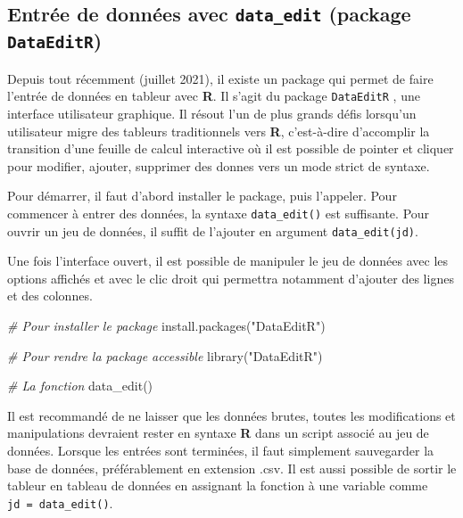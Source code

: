 \documentclass[
]{book}
\newenvironment{Shaded}{}{}
\newcommand{\CommentTok}[1]{\textit{#1}}
\newcommand{\FunctionTok}[1]{#1}
\newcommand{\NormalTok}[1]{#1}
\newcommand{\StringTok}[1]{#1}
\begin{document}
\hypertarget{entruxe9e-de-donnuxe9es-avec-data_edit-package-dataeditr}{%
\subsection{\texorpdfstring{Entrée de données avec \texttt{data\_edit} (package \texttt{DataEditR})}{Entrée de données avec data\_edit (package DataEditR)}}\label{entruxe9e-de-donnuxe9es-avec-data_edit-package-dataeditr}}

Depuis tout récemment (juillet 2021), il existe un package qui permet de faire l'entrée de données en tableur avec \textbf{R}. Il s'agit du package \texttt{DataEditR} \autocite{DataEditR}, une interface utilisateur graphique. Il résout l'un de plus grands défis lorsqu'un utilisateur migre des tableurs traditionnels vers \textbf{R}, c'est-à-dire d'accomplir la transition d'une feuille de calcul interactive où il est possible de pointer et cliquer pour modifier, ajouter, supprimer des donnes vers un mode strict de syntaxe.

Pour démarrer, il faut d'abord installer le package, puis l'appeler. Pour commencer à entrer des données, la syntaxe \texttt{data\_edit()} est suffisante. Pour ouvrir un jeu de données, il suffit de l'ajouter en argument \texttt{data\_edit(jd)}.

Une fois l'interface ouvert, il est possible de manipuler le jeu de données avec les options affichés et avec le clic droit qui permettra notamment d'ajouter des lignes et des colonnes.

\begin{Shaded}
\begin{Highlighting}[]
\CommentTok{\# Pour installer le package}
\FunctionTok{install.packages}\NormalTok{(}\StringTok{"DataEditR"}\NormalTok{)}

\CommentTok{\# Pour rendre la package accessible}
\FunctionTok{library}\NormalTok{(}\StringTok{"DataEditR"}\NormalTok{)}

\CommentTok{\# La fonction}
\FunctionTok{data\_edit}\NormalTok{()}
\end{Highlighting}
\end{Shaded}

Il est recommandé de ne laisser que les données brutes, toutes les modifications et manipulations devraient rester en syntaxe \textbf{R} dans un script associé au jeu de données. Lorsque les entrées sont terminées, il faut simplement sauvegarder la base de données, préférablement en extension .csv. Il est aussi possible de sortir le tableur en tableau de données en assignant la fonction à une variable comme \texttt{jd\ =\ data\_edit()}.
\end{document}
